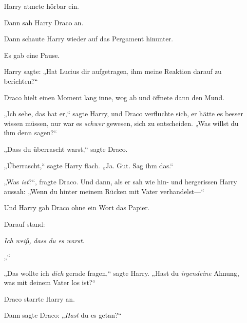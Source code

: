 Harry atmete hörbar ein.

Dann sah Harry Draco an.

Dann schaute Harry wieder auf das Pergament hinunter.

Es gab eine Pause.

Harry sagte: „Hat Lucius dir aufgetragen, ihm meine Reaktion darauf zu berichten?“

Draco hielt einen Moment lang inne, wog ab und öffnete dann den Mund.

„Ich sehe, das hat er,“ sagte Harry, und Draco verfluchte sich, er hätte es besser wissen müssen, nur war es \emph{schwer} gewesen, sich zu entscheiden. „Was willst du ihm denn sagen?“

„Dass du überrascht warst,“ sagte Draco.

„Überrascht,“ sagte Harry flach. „Ja. Gut. Sag ihm das.“

„Was \emph{ist}?“, fragte Draco. Und dann, als er sah wie hin- und hergerissen Harry aussah: „Wenn du hinter meinem Rücken mit Vater verhandelst—“

Und Harry gab Draco ohne ein Wort das Papier.

Darauf stand:

\emph{Ich weiß, dass du es warst.}

„\emph{}“

„Das wollte ich \emph{dich} gerade fragen,“ sagte Harry. „Hast du \emph{irgendeine} Ahnung, was mit deinem Vater los ist?“

Draco starrte Harry an.

Dann sagte Draco: „\emph{Hast} du es getan?“

